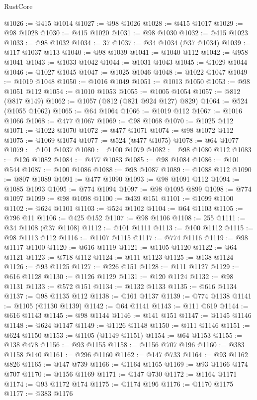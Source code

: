 \begin{lexlean}{RustCore}
\begin{coremodule}
@1026 := @415 @1014
@1027 := @98 @1026
@1028 := @415 @1017
@1029 := @98 @1028
@1030 := @415 @1020
@1031 := @98 @1030
@1032 := @415 @1023
@1033 := @98 @1032
@1034 := 37
@1037 := @34 @1034 (@37 @1034)
@1039 := @117 @1037 @113
@1040 := @98 @1039
@1041 := @1040 @112
@1042 := @958 @1041
@1043 := @1033 @1042
@1044 := @1031 @1043
@1045 := @1029 @1044
@1046 := @1027 @1045
@1047 := @1025 @1046
@1048 := @1022 @1047
@1049 := @1019 @1048
@1050 := @1016 @1049
@1051 := @1013 @1050
@1053 := @98 @1051 @112
@1054 := @1010 @1053
@1055 := @1005 @1054
@1057 := @812 (@817 @149)
@1062 := @1057 (@812 (@821 @924 @127) @829)
@1064 := @524 (@1055 @1062)
@1065 := @64 @1064
@1066 := @1019 @112
@1067 := @1016 @1066
@1068 := @477 @1067
@1069 := @98 @1068
@1070 := @1025 @112
@1071 := @1022 @1070
@1072 := @477 @1071
@1074 := @98 @1072 @112
@1075 := @1069 @1074
@1077 := @524 (@477 @1075)
@1078 := @64 @1077
@1079 := @101 @1037
@1080 := @100 @1079
@1082 := @98 @1080 @112
@1083 := @126 @1082
@1084 := @477 @1083
@1085 := @98 @1084
@1086 := @101 @544
@1087 := @100 @1086
@1088 := @98 @1087
@1089 := @1088 @112
@1090 := @807 @1089
@1091 := @477 @1090
@1093 := @98 @1091 @112
@1094 := @1085 @1093
@1095 := @774 @1094
@1097 := @98 @1095 @899
@1098 := @774 @1097
@1099 := @98 @1098
@1100 := @439 @151
@1101 := @1099 @1100
@1102 := @624 @1101
@1103 := @524 @1102
@1104 := @64 @1103
@1105 := @796 @11
@1106 := @425 @152
@1107 := @98 @1106
@1108 := 255
@1111 := @34 @1108 (@37 @1108)
@1112 := @101 @1111
@1113 := @100 @1112
@1115 := @98 @1113 @112
@1116 := @1107 @1115
@1117 := @774 @1116
@1119 := @98 @1117 @1100
@1120 := @616 @1119
@1121 := @1105 @1120
@1122 := @64 @1121
@1123 := @718 @112
@1124 := @111 @1123
@1125 := @138 @1124
@1126 := @93 @1125
@1127 := @226 @151
@1128 := @111 @1127
@1129 := @616 @1128
@1130 := @1126 @1129
@1131 := @120 @1124
@1132 := @98 @1131
@1133 := @572 @151
@1134 := @1132 @1133
@1135 := @616 @1134
@1137 := @98 @1135 @112
@1138 := @161 @1137
@1139 := @774 @1138
@1141 := @1105 (@1130 @1139)
@1142 := @64 @1141
@1143 := @111 @619
@1144 := @616 @1143
@1145 := @98 @1144
@1146 := @141 @151
@1147 := @1145 @1146
@1148 := @624 @1147
@1149 := @1126 @1148
@1150 := @111 @1146
@1151 := @624 @1150
@1153 := @1105 (@1149 @1151)
@1154 := @64 @1153
@1155 := @138 @478
@1156 := @93 @1155
@1158 := @1156 @707 @196
@1160 := @383 @1158 @140
@1161 := @296 @1160
@1162 := @147 @733
@1164 := @93 @1162 @826
@1165 := @147 @739
@1166 := @1164 @1165
@1169 := @93 @1166 @174 @707
@1170 := @1156 @1169
@1171 := @147 @730
@1172 := @1164 @1171
@1174 := @93 @1172 @174
@1175 := @1174 @196
@1176 := @1170 @1175
@1177 := @383 @1176

\end{coremodule}
\end{lexlean}
